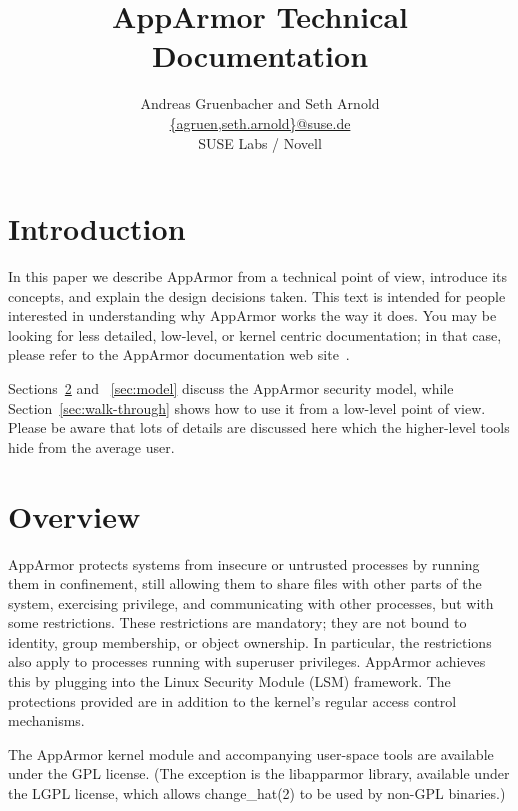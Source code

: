 \documentclass[a4paper]{article}
\title{AppArmor Technical Documentation}
\author{Andreas Gruenbacher and Seth Arnold \\
\url{{agruen,seth.arnold}@suse.de} \\
SUSE Labs / Novell}
\date{}
\begin{document}
\maketitle

\tableofcontents

\newpage


\section{Introduction}

In this paper we describe AppArmor from a technical point of view,
introduce its concepts, and explain the design decisions taken.  This
text is intended for people interested in understanding why AppArmor
works the way it does.  You may be looking for less detailed, low-level,
or kernel centric documentation; in that case, please refer to the
AppArmor documentation web site~\cite{apparmor}.

Sections~\ref{sec:overview} and ~\ref{sec:model} discuss the AppArmor
security model, while Section~\ref{sec:walk-through} shows how to use it
from a low-level point of view.  Please be aware that lots of details
are discussed here which the higher-level tools hide from the average
user.


\section{Overview}
\label{sec:overview}

AppArmor protects systems from insecure or untrusted processes by
running them in confinement, still allowing them to share files with
other parts of the system, exercising privilege, and communicating with
other processes, but with some restrictions.  These restrictions are
mandatory; they are not bound to identity, group membership, or object
ownership.  In particular, the restrictions also apply to processes
running with superuser privileges.  AppArmor achieves this by plugging
into the Linux Security Module (LSM) framework.  The protections
provided are in addition to the kernel's regular access control
mechanisms.

The AppArmor kernel module and accompanying user-space tools are
available under the GPL license. (The exception is the libapparmor
library, available under the LGPL license, which allows change\_hat(2)
to be used by non-GPL binaries.)
\end{document}
